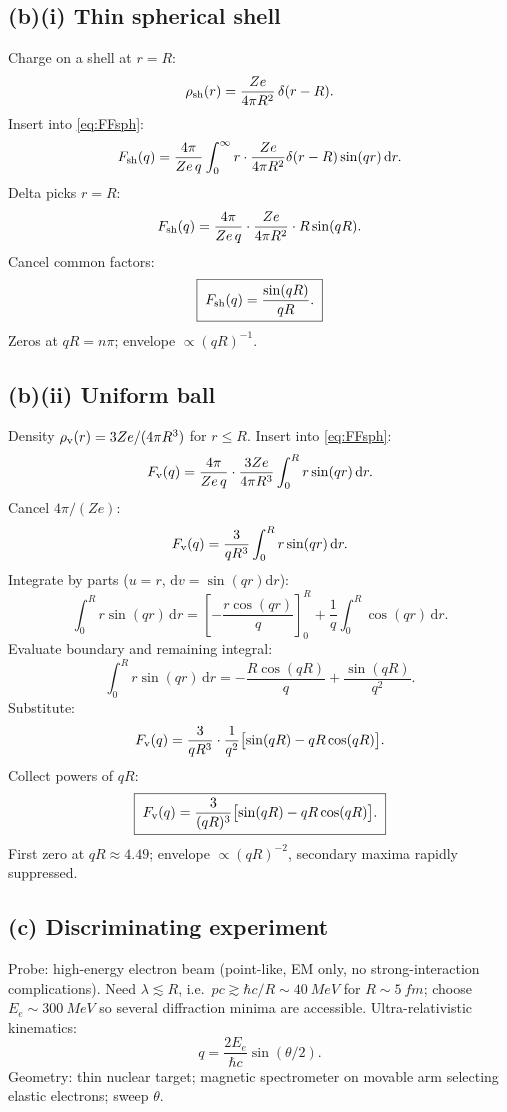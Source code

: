 \documentclass[11pt]{article}
\newcommand{\de}{\mathrm{d}}
\begin{document}
\subsection*{(b)(i) Thin spherical shell}

Charge on a shell at $r=R$:
\[
\rho_{\rm sh}(r)=\frac{Ze}{4\pi R^{2}}\,\delta(r-R).
\]
Insert into \eqref{eq:FFsph}:
\[
F_{\rm sh}(q)=\frac{4\pi}{Ze\,q}\int_{0}^{\infty}r\cdot\frac{Ze}{4\pi R^{2}}\delta(r-R)\sin(qr)\,\de r.
\]
Delta picks $r=R$:
\[
F_{\rm sh}(q)=\frac{4\pi}{Ze\,q}\cdot\frac{Ze}{4\pi R^{2}}\cdot R\sin(qR).
\]
Cancel common factors:
\begin{equation}
\boxed{\;F_{\rm sh}(q)=\frac{\sin(qR)}{qR}.\;}
\label{eq:Fsh}
\end{equation}
Zeros at $qR=n\pi$; envelope $\propto (qR)^{-1}$.

\subsection*{(b)(ii) Uniform ball}

Density $\rho_{\rm v}(r)=3Ze/(4\pi R^{3})$ for $r\le R$. Insert into \eqref{eq:FFsph}:
\[
F_{\rm v}(q)=\frac{4\pi}{Ze\,q}\cdot\frac{3Ze}{4\pi R^{3}}\int_{0}^{R}r\sin(qr)\,\de r.
\]
Cancel $4\pi/(Ze)$:
\[
F_{\rm v}(q)=\frac{3}{qR^{3}}\int_{0}^{R}r\sin(qr)\,\de r.
\]
Integrate by parts ($u=r$, $\de v=\sin(qr)\de r$):
\[
\int_{0}^{R}r\sin(qr)\,\de r=\left[-\frac{r\cos(qr)}{q}\right]_{0}^{R}+\frac{1}{q}\int_{0}^{R}\cos(qr)\,\de r.
\]
Evaluate boundary and remaining integral:
\[
\int_{0}^{R}r\sin(qr)\,\de r=-\frac{R\cos(qR)}{q}+\frac{\sin(qR)}{q^{2}}.
\]
Substitute:
\[
F_{\rm v}(q)=\frac{3}{qR^{3}}\cdot\frac{1}{q^{2}}\bigl[\sin(qR)-qR\cos(qR)\bigr].
\]
Collect powers of $qR$:
\begin{equation}
\boxed{\;F_{\rm v}(q)=\frac{3}{(qR)^{3}}\bigl[\sin(qR)-qR\cos(qR)\bigr].\;}
\label{eq:Fv}
\end{equation}
First zero at $qR\approx 4.49$; envelope $\propto (qR)^{-2}$, secondary maxima rapidly suppressed.

\subsection*{(c) Discriminating experiment}

Probe: high-energy electron beam (point-like, EM only, no strong-interaction complications). Need $\lambda\lesssim R$, i.e.\ $pc\gtrsim \hbar c/R\sim\SI{40}{MeV}$ for $R\sim\SI{5}{fm}$; choose $E_e\sim\SI{300}{MeV}$ so several diffraction minima are accessible. Ultra-relativistic kinematics:
\[
q=\frac{2E_e}{\hbar c}\sin(\theta/2).
\]
Geometry: thin nuclear target; magnetic spectrometer on movable arm selecting elastic electrons; sweep $\theta$.
\end{document}
